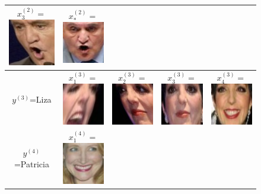 \documentclass[twoside,11pt]{article}
\begin{document}
\begin{figure}
\begin{tabular}{|c|ccc|c|}
  $x_3^{(2)} = $\includegraphics[scale = 0.2]{face_photos/Jean-Pierre_Raffarin_0003.png} &  
  $x_*^{(2)} = $\includegraphics[scale = 0.2]{face_photos/Jean-Pierre_Raffarin_0004.png} \\ \hline
$y^{(3)}$=Liza & 
  $x_1^{(3)} = $\includegraphics[scale = 0.2]{face_photos/Liza_Minnelli_0001.png} &  
  $x_2^{(3)} = $\includegraphics[scale = 0.2]{face_photos/Liza_Minnelli_0002.png} &  
  $x_3^{(3)} = $\includegraphics[scale = 0.2]{face_photos/Liza_Minnelli_0003.png} &  
  $x_4^{(3)} = $\includegraphics[scale = 0.2]{face_photos/Liza_Minnelli_0004.png} \\ \hline
$y^{(4)}$=Patricia & 
  $x_1^{(4)} = $\includegraphics[scale = 0.2]{face_photos/Patricia_Clarkson_0001.png} &  

\end{tabular}
\end{figure}
\end{document}
